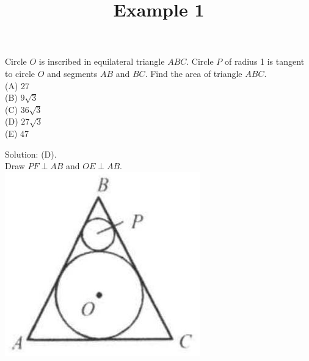 \documentclass{article}
\title{Example 1}
\date{}
\begin{document}
\maketitle

Circle \(O\) is inscribed in equilateral triangle \(A B C\). Circle \(P\) of radius 1 is tangent to circle \(O\) and segments \(A B\) and \(B C\). Find the area of triangle \(A B C\).\\
(A) 27\\
(B) \(9 \sqrt{3}\)\\
(C) \(36 \sqrt{3}\)\\
(D) \(27 \sqrt{3}\)\\
(E) 47

Solution: (D).\\
Draw \(P F \perp A B\) and \(O E \perp A B\).\\
\centering
\includegraphics[width=\textwidth]{images/problem_image_1.jpg}
\end{document}

